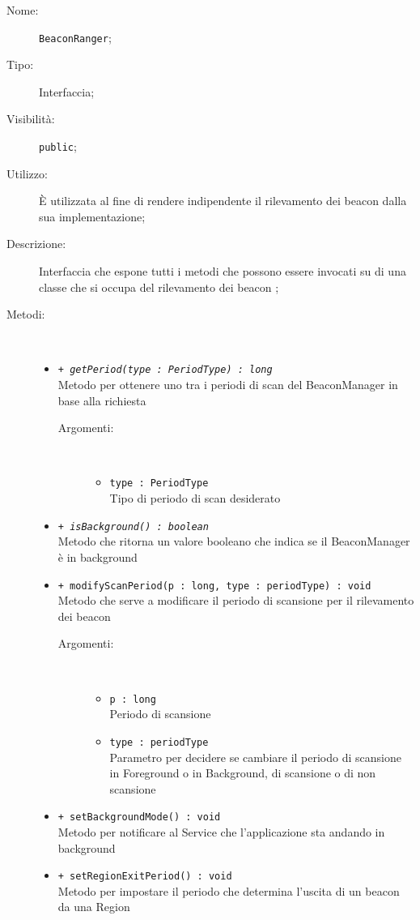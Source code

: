 \documentclass[../DefinizioneDiProdotto.tex]{subfiles}
\begin{document}
\begin{description}
	\item[Nome:] \texttt{BeaconRanger};
	\item[Tipo:] Interfaccia;
	\item[Visibilità:] \texttt{public};
	\item[Utilizzo:] È utilizzata al fine di rendere indipendente il rilevamento dei beacon dalla sua implementazione;
	\item[Descrizione:] Interfaccia che espone tutti i metodi che possono essere invocati su di una classe che si occupa del rilevamento dei beacon ;
	\item[Metodi:] \
	\begin{itemize}
		\item \texttt{+ \textit{getPeriod(type : PeriodType) : long}}\\
		Metodo per ottenere uno tra i periodi di scan del BeaconManager in base alla richiesta
		\begin{description}
			\item[Argomenti:] \
			\begin{itemize}
				\item \texttt{type : PeriodType}\\
				Tipo di periodo di scan desiderato\end{itemize}
		\end{description}
		\item \texttt{+ \textit{isBackground() : boolean}}\\
		Metodo che ritorna un valore booleano che indica se il BeaconManager è in background
		\item \texttt{+ modifyScanPeriod(p : long, type : periodType) : void}\\
		Metodo che serve a modificare il periodo di scansione per il rilevamento dei beacon
		\begin{description}
			\item[Argomenti:] \
			\begin{itemize}
				\item \texttt{p : long}\\
				Periodo di scansione\item \texttt{type : periodType}\\
				Parametro per decidere se cambiare il periodo di scansione in Foreground o in Background, di scansione o di non scansione\end{itemize}
		\end{description}
		\item \texttt{+ setBackgroundMode() : void}\\
		Metodo per notificare al Service che l'applicazione sta andando in background 
		\item \texttt{+ setRegionExitPeriod() : void}\\
		Metodo per impostare il periodo che determina l'uscita di un beacon da una Region
	\end{itemize}
\end{description}
\end{document}
